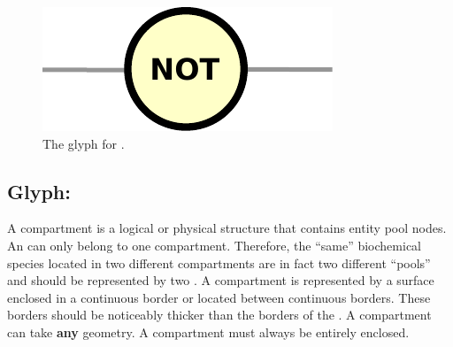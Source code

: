 \begin{figure}[htb]
  \centering
  \includegraphics[scale = 0.5]{le_images/not}
  \caption{The \PD glyph for .}
  \label{fig:not}
\end{figure}



%


\subsection{Glyph: }\label{sec:compartment}

A compartment is a logical or physical structure that contains entity pool nodes. An  can only belong to one compartment. Therefore, the ``same'' biochemical species located in two different compartments are in fact two different ``pools'' and should be represented by two .  A compartment is represented by a surface enclosed in a continuous border or located between continuous borders. These borders should be noticeably thicker than the borders of the . A compartment can take \textbf{any} geometry. A compartment must always be entirely enclosed.

